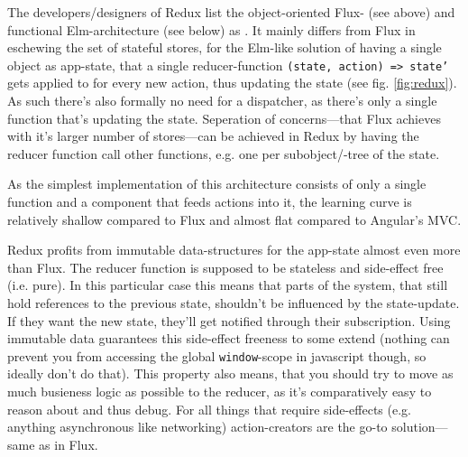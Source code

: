 The developers/designers of Redux list the object-oriented Flux- (see above) and functional Elm-architecture (see below) as . It mainly differs from Flux in eschewing the set of stateful stores, for the Elm-like solution of having a single object as app-state, that a single reducer-function \texttt{(state, action) => state'} gets applied to for every new action, thus updating the state (see fig. \ref{fig:redux}). As such there's also formally no need for a
dispatcher, as there's only a single function that's updating the state. Seperation of concerns---that Flux achieves with it's larger number of stores---can be achieved in Redux by having the reducer function call other functions, e.g. one per subobject/-tree of the state. 

As the simplest implementation of this architecture consists of only a single function and a component that feeds actions into it, the learning curve is relatively shallow compared to Flux and almost flat compared to Angular's MVC.

Redux profits from immutable data-structures for the app-state almost even more than Flux. The reducer function is supposed to be stateless and side-effect free (i.e. pure). In this particular case this means that parts of the system, that still hold references to the previous state, shouldn't be influenced by the state-update. If they want the new state, they'll get notified through their subscription. Using immutable data guarantees this side-effect freeness to some extend (nothing can
prevent you from accessing the global \texttt{window}-scope in javascript though, so ideally don't do that). This property also means, that you should try to move as much busieness logic as possible to the reducer, as it's comparatively easy to reason about and thus debug. For all things that require side-effects (e.g. anything asynchronous like networking) action-creators are the go-to solution---same as in Flux.

